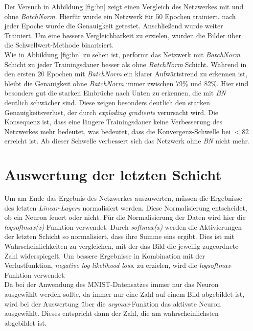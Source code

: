 Der Versuch in Abbildung \ref{fig:bn} zeigt einen Vergleich des Netzwerkes mit und ohne \textit{BatchNorm}. Hierfür wurde ein Netzwerk für 50 Epochen trainiert. nach jeder Epoche wurde die Genauigkeit getestet. Anschließend wurde weiter Trainiert. Um eine bessere Vergleichbarkeit zu erzielen, wurden die Bilder über die Schwellwert-Methode binarisiert.\\

Wie in Abbildung \ref{fig:bn} zu sehen ist, performt das Netzwerk mit \textit{BatchNorm} Schicht zu jeder Trainingsdauer besser als ohne \textit{BatchNorm} Schicht. Während in den ersten 20 Epochen mit \textit{BatchNorm} ein klarer Aufwärtstrend zu erkennen ist, bleibt die Genauigkeit ohne \textit{BatchNorm} immer zwischen 79\% und 82\%. Hier sind besonders gut die starken Einbrüche nach Unten zu erkennen, die mit \textit{BN} deutlich schwächer sind. Diese zeigen besonders deutlich den starken Genauigkeitsverlust, der durch \textit{exploding gradients} verursacht wird. Die Konsequenz ist, dass eine längere Trainingsdauer keine Verbesserung des Netzwerkes mehr bedeutet, was bedeutet, dass die Konvergenz-Schwelle bei $< 82$ erreicht ist. Ab dieser Schwelle verbessert sich das Netzwerk ohne \textit{BN} nicht mehr.


\section{Auswertung der letzten Schicht}
Um am Ende das Ergebnis des Netzwerkes auszuwerten, müssen die Ergebnisse des letzten \textit{Linear-Layers} normalisiert werden. Diese Normalisierung entscheidet, ob ein Neuron feuert oder nicht. Für die Normalisierung der Daten wird hier die \textit{logsoftmax(x)} Funktion verwendet. Durch \textit{softmax(x)} werden die Aktivierungen der letzten Schicht so normalisiert, dass ihre Summe eins ergibt. Dies ist mit Wahrscheinlichkeiten zu vergleichen, mit der das Bild die jeweilig zugeordnete Zahl widerspiegelt. Um bessere Ergebnisse in Kombination mit der Verlustfunktion, \textit{negative log likelihood loss}, zu erzielen, wird die \textit{logsoftmax}-Funktion verwendet.\\
Da bei der Anwendung des MNIST-Datensatzes immer nur das Neuron ausgewählt werden sollte, da immer nur eine Zahl auf einem Bild abgebildet ist, wird bei der Auswertung über die \textit{argmax}-Funktion das aktivste Neuron ausgewählt. Dieses entspricht dann der Zahl, die am wahrscheinlichsten abgebildet ist.


